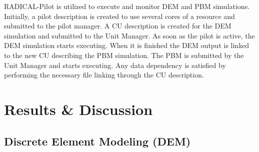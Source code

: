 \documentclass[preprint,11pt,authoryear]{elsarticle}
\begin{document}
RADICAL-Pilot is utilized to execute and monitor DEM and PBM simulations.
Initially, a pilot description is created to use several cores of a resource
and submitted to the pilot manager. A CU description is created for the DEM
simulation and submitted to the Unit Manager. As soon as the pilot is active,
the DEM simulation starts executing. When it is finished the DEM output is linked to 
the new CU describing the PBM
simulation. The PBM is submitted by the Unit Manager and starts executing. Any data
dependency is satisfied by performing the necessary file linking through the CU
description.



\section{Results \& Discussion}
\label{sec:Results}
\subsection{Discrete Element Modeling (DEM)}
\end{document}
